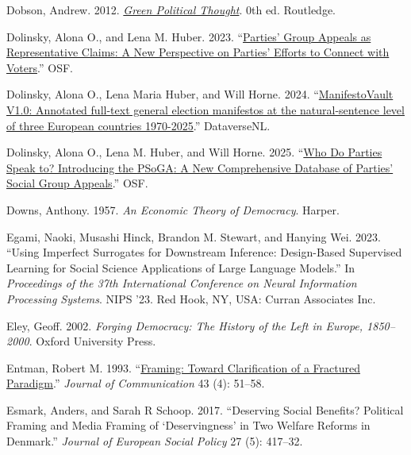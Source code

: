 \documentclass[12pt]{article}
\newlength{\cslhangindent}
\newenvironment{CSLReferences}[2]
  {\begin{list}{}{%
    \setlength{\itemindent}{0pt}
    \setlength{\leftmargin}{0pt}
    \setlength{\parsep}{0pt}
    \ifodd #1
      \setlength{\leftmargin}{\cslhangindent}
      \setlength{\itemindent}{-\cslhangindent}
    \fi
    \setlength{\itemsep}{#2\baselineskip}}}
  {\end{list}}
\begin{document}
\begin{CSLReferences}{1}{0}
Dobson, Andrew. 2012. \emph{\href{https://doi.org/10.4324/9780203131671}{Green Political Thought}}. 0th ed. Routledge.

Dolinsky, Alona O., and Lena M. Huber. 2023. {``\href{https://doi.org/10.31219/osf.io/a9sf6_v1}{Parties' Group Appeals as Representative Claims: A New Perspective on Parties' Efforts to Connect with Voters}.''} {OSF}.

Dolinsky, Alona O., Lena Maria Huber, and Will Horne. 2024. {``\href{https://doi.org/10.34894/VKQSPO}{{ManifestoVault V1.0: Annotated full-text general election manifestos at the natural-sentence level of three European countries 1970-2025}}.''} DataverseNL.

Dolinsky, Alona O., Lena M. Huber, and Will Horne. 2025. {``\href{https://doi.org/10.31219/osf.io/64jwa_v1}{Who Do Parties Speak to? Introducing the {PSoGA}: A New Comprehensive Database of Parties' Social Group Appeals}.''} {OSF}.

Downs, Anthony. 1957. \emph{An Economic Theory of Democracy}. Harper.

Egami, Naoki, Musashi Hinck, Brandon M. Stewart, and Hanying Wei. 2023. {``Using Imperfect Surrogates for Downstream Inference: Design-Based Supervised Learning for Social Science Applications of Large Language Models.''} In \emph{Proceedings of the 37th International Conference on Neural Information Processing Systems}. NIPS '23. Red Hook, NY, USA: Curran Associates Inc.

Eley, Geoff. 2002. \emph{Forging Democracy: The History of the Left in Europe, 1850--2000}. Oxford University Press.

Entman, Robert M. 1993. {``\href{https://doi.org/10.1111/j.1460-2466.1993.tb01304.x}{Framing: Toward Clarification of a Fractured Paradigm}.''} \emph{Journal of Communication} 43 (4): 51--58.

Esmark, Anders, and Sarah R Schoop. 2017. {``Deserving Social Benefits? Political Framing and Media Framing of {`Deservingness'} in Two Welfare Reforms in Denmark.''} \emph{Journal of European Social Policy} 27 (5): 417--32.


\end{CSLReferences}
\end{document}
